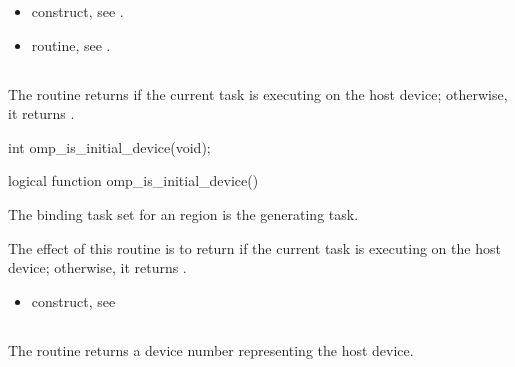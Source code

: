 \crossreferences
\begin{itemize}
\item {} construct, see 
.

\item {} routine, see 
. 
\end{itemize}









\subsection{}
\label{subsec:omp_is_initial_device}
\summary
The  routine returns  if the current task is executing 
on the host device; otherwise, it returns .

\begin{samepage}
\format
\ccppspecificstart
\begin{boxedcode}
int omp\_is\_initial\_device(void);
\end{boxedcode}
\ccppspecificend
\end{samepage}

\fortranspecificstart
\begin{boxedcode}
logical function omp\_is\_initial\_device()
\end{boxedcode}
\fortranspecificend

\binding
The binding task set for an  region is the generating task.

\effect
The effect of this routine is to return  if the current task is executing on the host 
device; otherwise, it returns .

\crossreferences
\begin{itemize}
\item {} construct, see 
\end{itemize}





\subsection{}
\label{subsec:omp_get_initial_device}
\summary
The  routine returns a device number representing
the host device.

